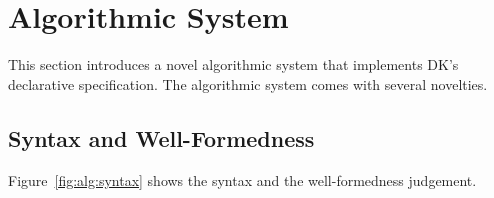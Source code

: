\section{Algorithmic System}

This section introduces a novel algorithmic system that implements 
DK's declarative specification. The algorithmic system comes with
several novelties.

\subsection{Syntax and Well-Formedness}

Figure~\ref{fig:alg:syntax} shows the syntax and the well-formedness judgement.

